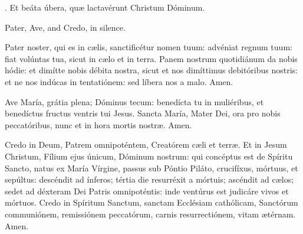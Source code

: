 \documentclass[12pt,a5paper,openany]{memoir}
\begin{document}
\Rbar. Et beáta úbera, quæ lactavérunt Christum Dóminum.

\switchcolumn



\switchcolumn*
{}

Pater, Ave, and Credo, in silence.

\switchcolumn


\switchcolumn*

Pater noster, qui es in cælis, sanctificétur nomen tuum: advéniat regnum tuum: fiat volúntas tua, sicut in cælo et in terra. Panem nostrum quotidiánum da nobis hódie: et dimítte nobis débita nostra, sicut et nos dimíttimus debitóribus nostris: et ne nos indúcas in tentatiónem: sed líbera nos a malo. Amen.

\switchcolumn


\switchcolumn*

Ave María, grátia plena; Dóminus tecum: benedícta tu in muliéribus, et benedíctus fructus ventris tui Jesus. Sancta María, Mater Dei, ora pro nobis peccatóribus, nunc et in hora mortis nostræ. Amen.


\switchcolumn


\switchcolumn*

Credo in Deum, Patrem omnipoténtem, Creatórem cæli et terræ. Et in Jesum Christum, Fílium ejus únicum, Dóminum nostrum: qui concéptus est de Spíritu Sancto, natus ex María Vírgine, passus sub Póntio Piláto, crucifíxus, mórtuus, et sepúltus: descéndit ad ínferos; tértia die resurréxit a mórtuis; ascéndit ad cælos; sedet ad déxteram Dei Patris omnipoténtis: inde ventúrus est judicáre vivos et mórtuos. Credo in Spíritum Sanctum, sanctam Ecclésiam cathólicam, Sanctórum communiónem, remissiónem peccatórum, carnis resurrectiónem, vitam ætérnam. Amen.
\switchcolumn
\end{document}
